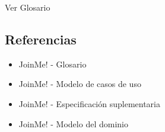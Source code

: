 \documentclass[12pt, a4paper, titlepage]{article}
\begin{document}
Ver Glosario

\subsection{Referencias}

\begin{itemize}

    \item JoinMe! - Glosario
    \item JoinMe! - Modelo de casos de uso
    \item JoinMe! - Especificación suplementaria
    \item JoinMe! - Modelo del dominio
\end{itemize}

\pagebreak
\end{document}
